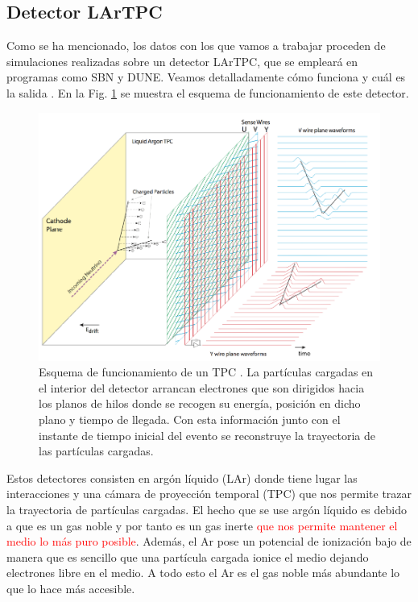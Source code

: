 \documentclass[a4paper,12pt,twoside,titlepage]{article}
\newcommand{\red}[1]{\textcolor{red}{#1}}
\begin{document}
\subsection*{Detector LArTPC}


Como se ha mencionado, los datos con los que vamos a trabajar proceden de simulaciones realizadas sobre un detector LArTPC, que se empleará en programas como SBN y DUNE. Veamos detalladamente cómo funciona y cuál es la salida \cite{sbnd}. En la Fig. \ref{fig:sensado} se muestra el esquema de funcionamiento de este detector.

\begin{figure}[h!]
  \centering
  \includegraphics[scale=0.65]{planos_sensado.PNG}
  \caption{Esquema de funcionamiento de un TPC \cite{sbnd}. La partículas cargadas en el interior del detector arrancan electrones que son dirigidos hacia los planos de hilos donde se recogen su energía, posición en dicho plano y tiempo de llegada. Con esta información junto con el instante de tiempo inicial del evento se reconstruye la trayectoria de las partículas cargadas.}
  \label{fig:sensado}
\end{figure}

Estos detectores consisten en argón líquido (LAr) donde tiene lugar las interacciones y una cámara de proyección temporal (TPC) que nos permite trazar la trayectoria de partículas cargadas. El hecho que se use argón líquido es debido a que es un gas noble y por tanto es un gas inerte \red{que nos permite mantener el medio lo más puro posible}. Además, el Ar pose un potencial de ionización bajo de manera que es sencillo que una partícula cargada ionice el medio dejando electrones libre en el medio. A todo esto el Ar es el gas noble más abundante \cite{lar_review} lo que lo hace más accesible. 
\end{document}
